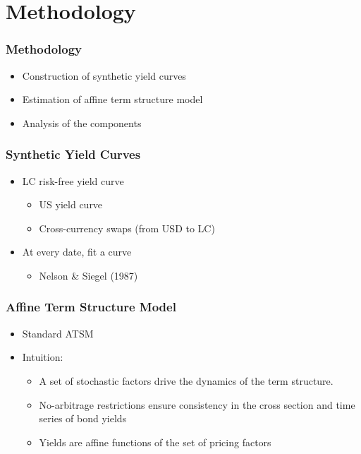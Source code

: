 \documentclass[12pt, xcolor=dvipsnames]{beamer} 			         %
\begin{document}
\section{Methodology}

\begin{frame}
	\frametitle{Methodology}
	\begin{itemize}
		\item Construction of synthetic yield curves
		\item Estimation of affine term structure model
		\item Analysis of the components
	\end{itemize}
\end{frame}

\begin{frame}
	\frametitle{Synthetic Yield Curves}
	\begin{itemize}
		\item LC risk-free yield curve
		\begin{itemize}
			\item US yield curve
			\item Cross-currency swaps (from USD to LC)
		\end{itemize}
		\item At every date, fit a curve
		\begin{itemize}
			\item Nelson \& Siegel (1987)
		\end{itemize}
	\end{itemize}
\end{frame}

\begin{frame}
	\frametitle{Affine Term Structure Model}
	\begin{itemize}
		\item Standard ATSM
		\item Intuition:
		\begin{itemize}
			\item A set of stochastic factors drive the dynamics of the term structure.
			\item No-arbitrage restrictions ensure consistency in the cross section and time series of bond yields
			\item Yields are affine functions of the set of pricing factors
		\end{itemize}
	\end{itemize}
\end{frame}
\end{document}
